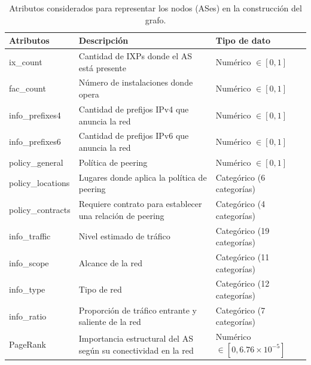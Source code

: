 \begin{table}[ht]

\centering

\footnotesize


\begin{tabular}{|p{3.6cm}|p{6.8cm}|p{4cm}|}

\hline

\rowcolor{white}  %

\textbf{Atributos} & \textbf{Descripción} & \textbf{Tipo de dato} \\

\hline

ix\_count & Cantidad de IXPs donde el AS está presente & Numérico $\in [0,1] $\\

fac\_count & Número de instalaciones donde opera & Numérico $\in [0,1]$ \\

info\_prefixes4 & Cantidad de prefijos IPv4 que anuncia la red & Numérico $\in [0,1]$ \\

info\_prefixes6 & Cantidad de prefijos IPv6 que anuncia la red & Numérico $\in [0,1]$ \\

policy\_general & Política de peering & Numérico $\in [0,1]$ \\

policy\_locations & Lugares donde aplica la política de peering & Categórico (6 categorías) \\

policy\_contracts & Requiere contrato para establecer una relación de peering& Categórico (4 categorías) \\

info\_traffic & Nivel estimado de tráfico & Categórico (19 categorías) \\

info\_scope & Alcance de la red & Categórico (11 categorías) \\

info\_type & Tipo de red & Categórico (12 categorías) \\

info\_ratio & Proporción de tráfico entrante y saliente de la red & Categórico (7 categorías) \\

PageRank & Importancia estructural del AS según su conectividad en la red & Numérico $\in[0, 6.76 \times 10^{-5}]$ \\ %

\hline

\end{tabular}

\caption{Atributos considerados para representar los nodos (ASes) en la construcción del grafo.}

\label{tab:as_attr_tabla}

\end{table}


